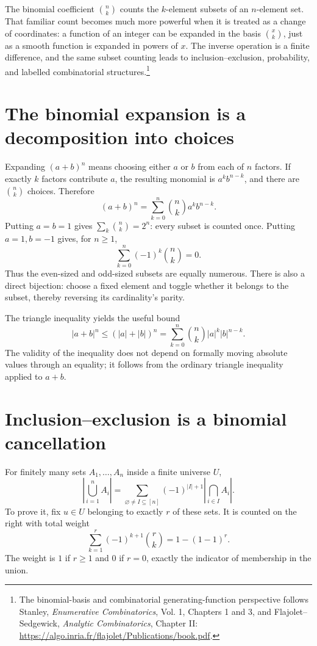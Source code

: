 
The binomial coefficient \(\binom nk\) counts the \(k\)-element subsets of an \(n\)-element set. That familiar count becomes much more powerful when it is treated as a change of coordinates: a function of an integer can be expanded in the basis \(\binom xk\), just as a smooth function is expanded in powers of \(x\). The inverse operation is a finite difference, and the same subset counting leads to inclusion--exclusion, probability, and labelled combinatorial structures.\footnote{The binomial-basis and combinatorial generating-function perspective follows Stanley, \emph{Enumerative Combinatorics}, Vol. 1, Chapters 1 and 3, and Flajolet--Sedgewick, \emph{Analytic Combinatorics}, Chapter II: \url{https://algo.inria.fr/flajolet/Publications/book.pdf}.}

\section{The binomial expansion is a decomposition into choices}

Expanding \((a+b)^n\) means choosing either \(a\) or \(b\) from each of \(n\) factors. If exactly \(k\) factors contribute \(a\), the resulting monomial is \(a^kb^{n-k}\), and there are \(\binom nk\) choices. Therefore
\[
 \boxed{(a+b)^n=\sum_{k=0}^n\binom nk a^kb^{n-k}.}
\]
Putting \(a=b=1\) gives \(\sum_k\binom nk=2^n\): every subset is counted once. Putting \(a=1,b=-1\) gives, for \(n\ge1\),
\[
 \sum_{k=0}^n(-1)^k\binom nk=0.
\]
Thus the even-sized and odd-sized subsets are equally numerous. There is also a direct bijection: choose a fixed element and toggle whether it belongs to the subset, thereby reversing its cardinality's parity.

The triangle inequality yields the useful bound
\[
 |a+b|^n\le(|a|+|b|)^n
 =\sum_{k=0}^n\binom nk|a|^k|b|^{n-k}.
\]
The validity of the inequality does not depend on formally moving absolute values through an equality; it follows from the ordinary triangle inequality applied to \(a+b\).

\section{Inclusion--exclusion is a binomial cancellation}

For finitely many sets \(A_1,\ldots,A_n\) inside a finite universe \(U\),
\[
 \left|\bigcup_{i=1}^nA_i\right|
 =\sum_{\varnothing\ne I\subseteq[n]}
     (-1)^{|I|+1}\left|\bigcap_{i\in I}A_i\right|.
\]
To prove it, fix \(u\in U\) belonging to exactly \(r\) of these sets. It is counted on the right with total weight
\[
 \sum_{k=1}^{r}(-1)^{k+1}\binom rk
 =1-(1-1)^r.
\]
The weight is \(1\) if \(r\ge1\) and \(0\) if \(r=0\), exactly the indicator of membership in the union.

